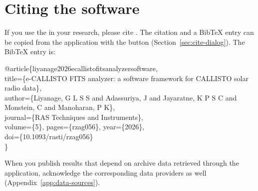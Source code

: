 \section{Citing the software}
\label{sec:citing}

If you use the \appname{} in your research, please cite \textcite{liyanage2026}. The
citation and a BibTeX entry can be copied from the application with the
 button (Section~\ref{sec:cite-dialog}). The BibTeX entry is:

\begin{tcolorbox}[enhanced, colback=black!3, colframe=rulegray, boxrule=0.5pt, arc=1pt,
  fontupper=\ttfamily\footnotesize, left=6pt, right=6pt]
@article\{liyanage2026ecallistofitsanalyzersoftware,\\
\hspace*{1.5em}title=\{e-CALLISTO FITS analyzer: a software framework for CALLISTO solar radio data\},\\
\hspace*{1.5em}author=\{Liyanage, G L S S and Adassuriya, J and Jayaratne, K P S C and Monstein, C and Manoharan, P K\},\\
\hspace*{1.5em}journal=\{RAS Techniques and Instruments\},\\
\hspace*{1.5em}volume=\{5\}, pages=\{rzag056\}, year=\{2026\},\\
\hspace*{1.5em}doi=\{10.1093/rasti/rzag056\}\\
\}
\end{tcolorbox}

When you publish results that depend on archive data retrieved through the application,
acknowledge the corresponding data providers as well (Appendix~\ref{app:data-sources}).
